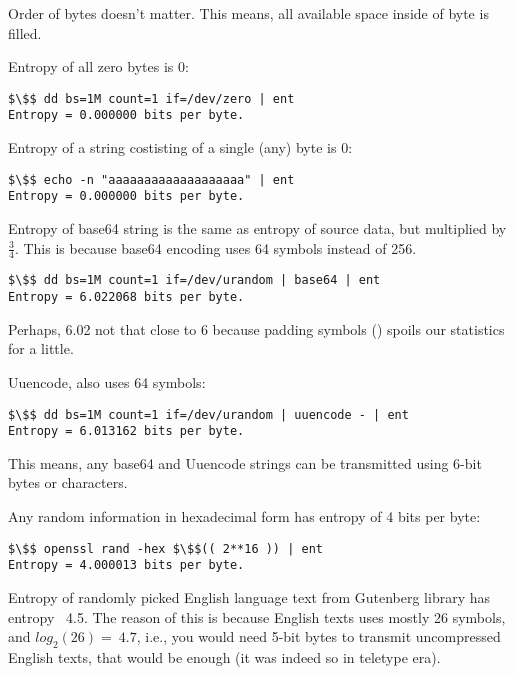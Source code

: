 Order of bytes doesn't matter.
This means, all available space inside of byte is filled.

Entropy of all zero bytes is 0:

\begin{lstlisting}[basicstyle=\ttfamily, mathescape]
$\$$ dd bs=1M count=1 if=/dev/zero | ent
Entropy = 0.000000 bits per byte.
\end{lstlisting}

Entropy of a string costisting of a single (any) byte is 0:

\begin{lstlisting}[basicstyle=\ttfamily, mathescape]
$\$$ echo -n "aaaaaaaaaaaaaaaaaaa" | ent
Entropy = 0.000000 bits per byte.
\end{lstlisting}

Entropy of base64 string is the same as entropy of source data, but multiplied by $\frac{3}{4}$.
This is because base64 encoding uses 64 symbols instead of 256.

\begin{lstlisting}[basicstyle=\ttfamily, mathescape]
$\$$ dd bs=1M count=1 if=/dev/urandom | base64 | ent
Entropy = 6.022068 bits per byte.
\end{lstlisting}

Perhaps, 6.02 not that close to 6 because padding symbols (\TT{=}) spoils our statistics for a little.

Uuencode, also uses 64 symbols:

\begin{lstlisting}[basicstyle=\ttfamily, mathescape]
$\$$ dd bs=1M count=1 if=/dev/urandom | uuencode - | ent
Entropy = 6.013162 bits per byte.
\end{lstlisting}

This means, any base64 and Uuencode strings can be transmitted using 6-bit bytes or characters.

Any random information in hexadecimal form has entropy of 4 bits per byte:

\begin{lstlisting}[basicstyle=\ttfamily, mathescape]
$\$$ openssl rand -hex $\$$(( 2**16 )) | ent
Entropy = 4.000013 bits per byte.
\end{lstlisting}

Entropy of randomly picked English language text from Gutenberg library has entropy ~4.5.
The reason of this is because English texts uses mostly 26 symbols, and $log_2(26)=~4.7$, i.e., you would need
5-bit bytes to transmit uncompressed English texts, that would be enough (it was indeed so in teletype era).

